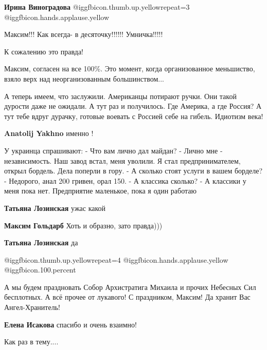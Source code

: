 \begin{itemize}
\begin{itemize}
\textbf{Ирина Виноградова}  @igg{fbicon.thumb.up.yellow}{repeat=3}  @igg{fbicon.hands.applause.yellow} 
\end{itemize} %

Максим!!!
Как всегда- в десяточку!!!!!!
Умничка!!!!!

К сожалению это правда!

Максим, согласен на все 100\%. Это момент, когда организованное меньшиство, взяло верх над неорганизованным большинством...

\begin{itemize} %

А теперь имеем, что заслужили. Американцы потирают ручки. Они такой дурости
даже не ожидали. А тут раз и получилось. Где Америка, а где Россия? А тут тебе
вдруг дурачку, готовые воевать с Россией себе на гибель. Идиотизм века!

\textbf{Anatolij Yakhno} именно !
\end{itemize} %


У украинца спрашивают: - Что вам лично дал майдан? - Лично мне - независимость.
Наш завод встал, меня уволили. Я стал предпринимателем, открыл бордель. Дела
поперли в гору. - А сколько стоят услуги в вашем борделе? - Недорого, анал 200
гривен, орал 150. - А классика сколько? - А классики у меня пока нет.
Предприятие маленькое, пока я один работаю

\begin{itemize} %
\textbf{Татьяна Лозинская} ужас какой

\textbf{Максим Гольдарб} Хоть и образно, зато правда)))

\textbf{Татьяна Лозинская} да
\end{itemize} %

 @igg{fbicon.thumb.up.yellow}{repeat=4}  @igg{fbicon.hands.applause.yellow}  @igg{fbicon.100.percent} 

А мы будем праздновать Собор Архистратига Михаила и прочих Небесных Сил бесплотных.
А всё прочее от лукавого!
С праздником, Максим! Да хранит Вас Ангел-Хранитель!

\textbf{Елена Исакова} спасибо и очень взаимно!

Как раз в тему....


\end{itemize}
